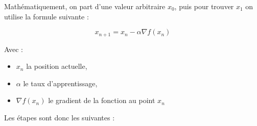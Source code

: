 \documentclass[10pt,french]{report}
\begin{document}
    Mathématiquement, on part d'une valeur arbitraire $x_0$, puis pour trouver $x_1$ on utilise la formule suivante :

    \begin{equation}
        x_{n+1} = x_n - \alpha \nabla f\left(x_n\right)
    \end{equation}

    Avec :
    \begin{itemize}
        \item $x_n$ la position actuelle,
        \item $\alpha$ le taux d'apprentissage,
        \item $\nabla f\left(x_n\right)$ le gradient de la fonction au point $x_n$
    \end{itemize}

    Les étapes sont donc les suivantes :
\end{document}
